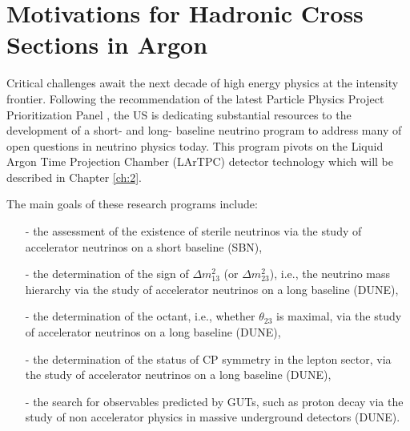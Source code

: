 




\section{Motivations for Hadronic Cross Sections in Argon} \label{ch:MotHadXS} 
Critical challenges await  the next decade of high energy physics at the intensity frontier. %
Following the recommendation of the latest Particle Physics Project Prioritization Panel  \cite{P5}, the US  is dedicating substantial resources to the development of a short- and long- baseline neutrino program to address many of open questions in neutrino physics today.  This program pivots on the Liquid Argon Time Projection Chamber (LArTPC) detector technology which will be described in Chapter \ref{ch:2}.  

The main goals of these research programs include:

\begin{itemize}
\item[-] the assessment of the existence of sterile neutrinos via the study of accelerator neutrinos on a short baseline (SBN), 
\item[-] the determination of the sign of $\Delta m^2_{13}$ (or $\Delta m^2_{23}$), i.e., the neutrino mass hierarchy via the study of accelerator neutrinos on a long baseline (DUNE),
\item[-] the determination of the octant, i.e.,  whether $\theta_{23}$ is maximal, via the study of accelerator neutrinos on a long baseline (DUNE),
\item[-] the determination of the status of CP symmetry in the lepton sector, via the study of accelerator neutrinos on a long baseline (DUNE),
\item[-] the search for observables predicted by GUTs, such as proton decay via the study of non accelerator physics in massive underground detectors (DUNE).
\end{itemize}

